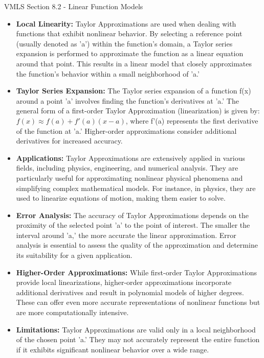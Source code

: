 \begin{notes}{VMLS Section 8.2 - Linear Function Models}
    \begin{itemize}
        \item \textbf{Local Linearity:} Taylor Approximations are used when dealing with functions that exhibit nonlinear behavior. By selecting a reference point (usually denoted as 'a') within the 
        function's domain, a Taylor series expansion is performed to approximate the function as a linear equation around that point. This results in a linear model that closely approximates the 
        function's behavior within a small neighborhood of 'a.'
        \item \textbf{Taylor Series Expansion:} The Taylor series expansion of a function f(x) around a point 'a' involves finding the function's derivatives at 'a.' The general form of a first-order 
        Taylor Approximation (linearization) is given by: $f(x) \approx f(a) + f'(a)(x - a)$, where f'(a) represents the first derivative of the function at 'a.' Higher-order approximations consider 
        additional derivatives for increased accuracy.
        \item \textbf{Applications:} Taylor Approximations are extensively applied in various fields, including physics, engineering, and numerical analysis. They are particularly useful for approximating 
        nonlinear physical phenomena and simplifying complex mathematical models. For instance, in physics, they are used to linearize equations of motion, making them easier to solve.
        \item \textbf{Error Analysis:} The accuracy of Taylor Approximations depends on the proximity of the selected point 'a' to the point of interest. The smaller the interval around 'a,' the more 
        accurate the linear approximation. Error analysis is essential to assess the quality of the approximation and determine its suitability for a given application.
        \item \textbf{Higher-Order Approximations:} While first-order Taylor Approximations provide local linearizations, higher-order approximations incorporate additional derivatives and result in 
        polynomial models of higher degrees. These can offer even more accurate representations of nonlinear functions but are more computationally intensive.
        \item \textbf{Limitations:} Taylor Approximations are valid only in a local neighborhood of the chosen point 'a.' They may not accurately represent the entire function if it exhibits significant 
        nonlinear behavior over a wide range.
    \end{itemize}


\end{notes}
